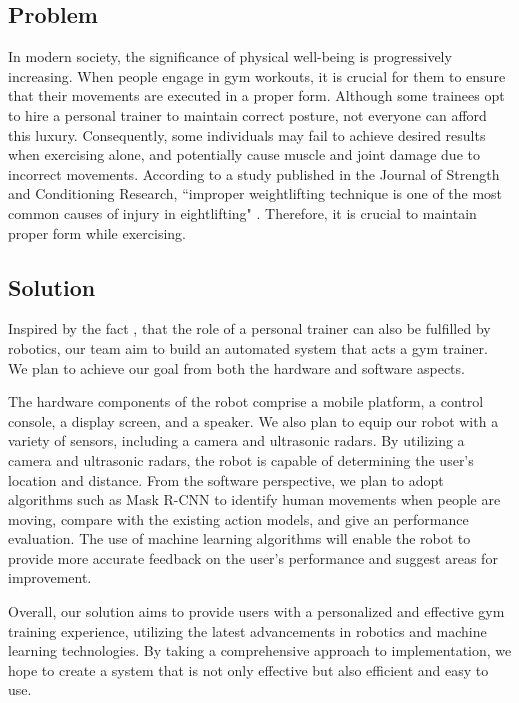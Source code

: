 \subsection{Problem}
In modern society, the significance of physical well-being is progressively increasing. When people engage in gym workouts, it is crucial for them to ensure that their movements are executed in a proper form. Although some trainees opt to hire a personal trainer to maintain correct posture, not everyone can afford this luxury. Consequently, some individuals may fail to achieve desired results when exercising alone, and potentially cause muscle and joint damage due to incorrect movements. According to a study published in the Journal of Strength and Conditioning Research, ``improper weightlifting technique is one of the most common causes of injury in eightlifting" \cite{keogh2006injury}. Therefore, it is crucial to maintain proper form while exercising.

\subsection{Solution}
Inspired by the fact \cite{li2019real}, \cite{liu2021robotics} that the role of a personal trainer can also be fulfilled by robotics, our team aim to build an automated system that acts a gym trainer. We plan to achieve our goal from both the hardware and software aspects.

The hardware components of the robot comprise a mobile platform, a control console, a display screen, and a speaker. We also plan to equip our robot with a variety of sensors, including a camera and ultrasonic radars. By utilizing a camera and ultrasonic radars, the robot is capable of determining the user’s location and distance. From the software perspective, we plan to adopt algorithms such as Mask R-CNN to identify human movements when people are moving, compare with the existing action models, and give an performance evaluation. The use of machine learning algorithms will enable the robot to provide more accurate feedback on the user’s performance and suggest areas for improvement. 

Overall, our solution aims to provide users with a personalized and effective gym training experience, utilizing the latest advancements in robotics and machine learning technologies. By taking a comprehensive approach to implementation, we hope to create a system that is not only effective but also efficient and easy to use.


